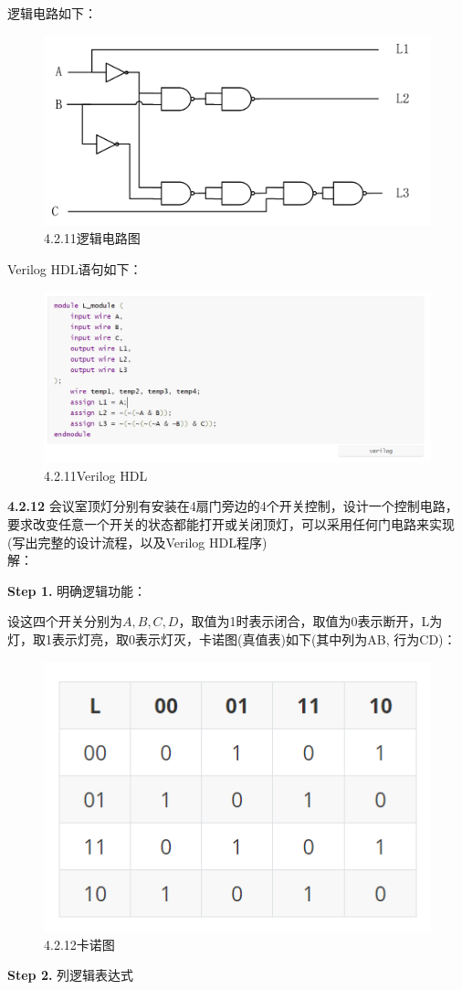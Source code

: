 \documentclass[a4paper,11pt,UTF8]{article}
\begin{document}
逻辑电路如下：
\begin{figure}[H]
	\centering
	\includegraphics[scale=0.25]{SD4.2.11_1}
	\caption{4.2.11逻辑电路图}
\end{figure}
Verilog HDL语句如下：
\begin{figure}[H]
	\centering
	\includegraphics[scale=0.35]{SD4.2.11_2}
	\caption{4.2.11Verilog HDL}
\end{figure}
\textbf{4.2.12} 会议室顶灯分别有安装在4扇门旁边的4个开关控制，设计一个控制电路，要求改变任意一个开关的状态都能打开或关闭顶灯，可以采用任何门电路来实现(写出完整的设计流程，以及Verilog HDL程序)\\
解：

\textbf{Step 1.} 明确逻辑功能：

设这四个开关分别为$A,B,C,D$，取值为1时表示闭合，取值为0表示断开，L为灯，取1表示灯亮，取0表示灯灭，卡诺图(真值表)如下(其中列为AB, 行为CD)：
\begin{figure}[H]
	\centering
	\includegraphics[scale=0.29]{SD4.2.12_1}
	\caption{4.2.12卡诺图}
\end{figure}
\textbf{Step 2.} 列逻辑表达式
\end{document}
